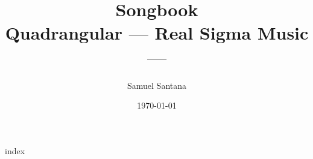 



\title{\rmfamily\bfseries\Huge Songbook \\ Quadrangular 
    \vfill
    \sffamily\small --- Real Sigma Music ---}
\author{\sffamily\small Samuel Santana}
\date{\sffamily\small\today}

\maketitle

\thispagestyle{empty}
\cleardoublepage


\begin{songs}{index}

 \brk
 \brk
 \brk
 \brk
 \brk

\end{songs}

\newpage
\thispagestyle{empty}
\null
\newpage


